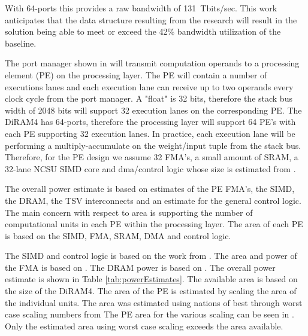 With 64-ports this provides a raw bandwidth of \SI{131}{\tera bits/sec}. This work anticipates that the data structure resulting from the research will result in 
the solution being able to meet or exceed the 42\% bandwidth utilization of the baseline.

The port manager shown in  will transmit computation operands to a processing element (PE) on the processing layer.
The PE will contain a number of executions lanes and each execution lane can receive up to two operands every clock
cycle from the port manager. A "float" is 32 bits, therefore the stack bus width of 2048 bits will support 32 execution lanes on the corresponding PE.
The DiRAM4 has 64-ports, therefore the processing layer will support 64 PE's with each PE supporting 32 execution lanes.
In practice, each execution lane will be performing a multiply-accumulate on the weight/input tuple from the stack bus.
Therefore, for the PE design we assume 32 FMA's, a small amount of SRAM, a 32-lane NCSU SIMD core
and dma/control logic whose size is estimated from \cite{afrl_cortical}.

The overall power estimate is based on estimates of the PE FMA's, the SIMD, the DRAM, the TSV interconnects and an estimate for the
general control logic.
The main concern with respect to area is supporting the number of computational units in each PE within the processing layer. 
The area of each PE is based on the SIMD, FMA, SRAM, DMA and control logic.

The SIMD and control logic is based on the work from \cite{afrl_cortical}. The area and power of the FMA is based on \cite{galal2011energy}.
The DRAM power is based on \cite{tezzaron:diram4}.
The overall power estimate is shown in Table \ref{tab:powerEstimates}.
The available area is based on the size of the DiRAM4. The area of the PE is estimated by scaling the area of the individual units.
The area was estimated using nations of best through worst case scaling numbers from \cite{schabel2014energy}
The PE area for the various scaling can be seen in . Only the estimated area using worst case scaling exceeds the area available.

